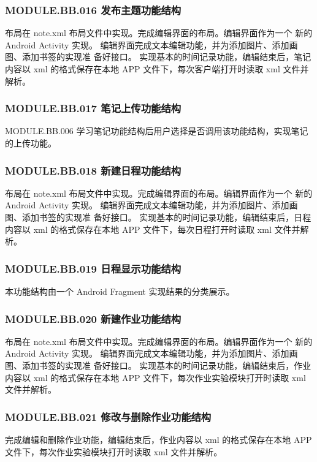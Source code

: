 \subsubsection{MODULE.BB.016    发布主题功能结构}
布局在 note.xml 布局文件中实现。完成编辑界面的布局。编辑界面作为一个 新的 Android Activity 实现。
编辑界面完成文本编辑功能，并为添加图片、添加画图、添加书签的实现准 备好接口。
实现基本的时间记录功能，编辑结束后，笔记内容以 xml 的格式保存在本地 APP 文件下，每次客户端打开时读取 xml 文件并解析。

\subsubsection{MODULE.BB.017    笔记上传功能结构}
MODULE.BB.006    学习笔记功能结构后用户选择是否调用该功能结构，实现笔记的上传功能。

\subsubsection{MODULE.BB.018    新建日程功能结构}
布局在 note.xml 布局文件中实现。完成编辑界面的布局。编辑界面作为一个 新的 Android Activity 实现。
编辑界面完成文本编辑功能，并为添加图片、添加画图、添加书签的实现准 备好接口。
实现基本的时间记录功能，编辑结束后，日程内容以 xml 的格式保存在本地 APP 文件下，每次日程打开时读取 xml 文件并解析。

\subsubsection{MODULE.BB.019    日程显示功能结构}
本功能结构由一个 Android Fragment 实现结果的分类展示。

\subsubsection{MODULE.BB.020    新建作业功能结构}
布局在 note.xml 布局文件中实现。完成编辑界面的布局。编辑界面作为一个 新的 Android Activity 实现。
编辑界面完成文本编辑功能，并为添加图片、添加画图、添加书签的实现准 备好接口。
实现基本的时间记录功能，编辑结束后，作业内容以 xml 的格式保存在本地 APP 文件下，每次作业实验模块打开时读取 xml 文件并解析。

\subsubsection{MODULE.BB.021    修改与删除作业功能结构}
完成编辑和删除作业功能，编辑结束后，作业内容以 xml 的格式保存在本地 APP 文件下，每次作业实验模块打开时读取 xml 文件并解析。

